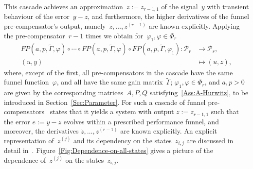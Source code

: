 \documentclass[ envcountsect, envcountsame]{svjour3}
\newcommand{\cP}{\mathcal{P}}
\newcommand{\vp}{\varphi}
\begin{document}
%
%
This cascade achieves an approximation~$z := z_{r-1,1}$ of the signal~$y$ with transient behaviour of the error~$y-z$, and furthermore, the higher derivatives of the funnel pre-compensator's output, namely~$\dot z,\ldots,z^{(r-1)}$ are known explicitly.
%
%
%
Applying the pre-compensator~$r-1$ times we obtain for~$\vp_1, \vp \in \Phi_r$
\begin{equation} \label{eq:FPC-cascade}
\begin{aligned}
FP({a,p},\tilde \Gamma,\vp) \circ \cdots \circ FP({a,p},\tilde \Gamma,\vp) \circ FP({a,p}, \tilde \Gamma,\vp_1) : \cP_r &\to \cP_{r} , \\
(u,y) & \mapsto (u, z) ,
\end{aligned}
\end{equation}
%
where, except of the first, all pre-compensators in the cascade have the same funnel function~$\vp$, and all have the same gain matrix~$\tilde \Gamma$;
 $\vp_1, \vp \in \Phi_r$, and ${a,p>0}$ are given by the corresponding matrices~$A,P,Q$ satisfying~\ref{Ass:A-Hurwitz}, to be introduced in Section~\ref{Sec:Parameter}.
%
%
For such a cascade of funnel pre-compensators~\cite[Thm. 1]{BergReis18b} states that it yields a system with output $z := z_{r-1,1}$ such that the error $e := y - z$ evolves within a prescribed performance funnel, and moreover, the derivatives $\dot z, \ldots, z^{(r-1)}$ are known explicitly.
An explicit representation of~$z^{(j)}$ and its dependency on the states~$z_{i,j}$ are discussed in detail in~\cite[Rem.~3]{BergReis18b}.
Figure~\ref{Fig:Dependence-on-all-states} gives a picture of the dependence of~$z^{(j)}$ on the states~$z_{i,j}$.
%
\end{document}
